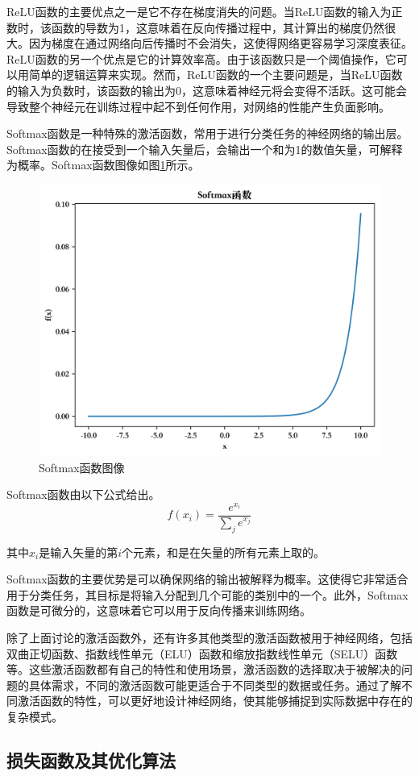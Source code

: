 ReLU函数的主要优点之一是它不存在梯度消失的问题。当ReLU函数的输入为正数时，该函数的导数为1，这意味着在反向传播过程中，其计算出的梯度仍然很大。因为梯度在通过网络向后传播时不会消失，这使得网络更容易学习深度表征。ReLU函数的另一个优点是它的计算效率高。由于该函数只是一个阈值操作，它可以用简单的逻辑运算来实现。然而，ReLU函数的一个主要问题是，当ReLU函数的输入为负数时，该函数的输出为0，这意味着神经元将会变得不活跃。这可能会导致整个神经元在训练过程中起不到任何作用，对网络的性能产生负面影响。


Softmax函数是一种特殊的激活函数，常用于进行分类任务的神经网络的输出层。Softmax函数的在接受到一个输入矢量后，会输出一个和为1的数值矢量，可解释为概率。Softmax函数图像如图\ref{Softmax}所示。

\begin{figure}[htbp]
  \centering
  \includegraphics[width=.5\linewidth]{figures/content/Softmax.png}
  \caption{Softmax函数图像}
  \label{Softmax}
\end{figure}
Softmax函数由以下公式给出。
\begin{equation}
\label{eq:2_17}
f(x_i) = \frac{e^{x_i}} {\sum_{j}{e^{x_j}}}
\end{equation}

其中$x_i$是输入矢量的第$i$个元素，和是在矢量的所有元素上取的。

Softmax函数的主要优势是可以确保网络的输出被解释为概率。这使得它非常适合用于分类任务，其目标是将输入分配到几个可能的类别中的一个。此外，Softmax函数是可微分的，这意味着它可以用于反向传播来训练网络。

除了上面讨论的激活函数外，还有许多其他类型的激活函数被用于神经网络，包括双曲正切函数、指数线性单元（ELU）函数和缩放指数线性单元（SELU）函数等。这些激活函数都有自己的特性和使用场景，激活函数的选择取决于被解决的问题的具体需求，不同的激活函数可能更适合于不同类型的数据或任务。通过了解不同激活函数的特性，可以更好地设计神经网络，使其能够捕捉到实际数据中存在的复杂模式。


\subsection{损失函数及其优化算法}

